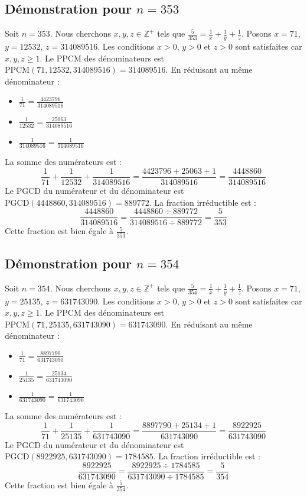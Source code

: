 \documentclass[11pt,a4paper]{article}
\begin{document}
\subsection{Démonstration pour $n = 353$}
Soit $n = 353$. Nous cherchons $x, y, z \in \mathbb{Z}^{+}$ tels que $\frac{5}{353} = \frac{1}{x} + \frac{1}{y} + \frac{1}{z}$.
Posons $x = 71$, $y = 12532$, $z = 314089516$.
Les conditions $x > 0$, $y > 0$ et $z > 0$ sont satisfaites car $x, y, z \geq 1$.
Le PPCM des dénominateurs est $\text{PPCM}(71, 12532, 314089516) = 314089516$.
En réduisant au même dénominateur :
\begin{itemize}
    \item $\frac{1}{71} = \frac{4423796}{314089516}$
    \item $\frac{1}{12532} = \frac{25063}{314089516}$
    \item $\frac{1}{314089516} = \frac{1}{314089516}$
\end{itemize}
La somme des numérateurs est :
$$ \frac{1}{71} + \frac{1}{12532} + \frac{1}{314089516} = \frac{4423796 + 25063 + 1}{314089516} = \frac{4448860}{314089516} $$
Le PGCD du numérateur et du dénominateur est $\text{PGCD}(4448860, 314089516) = 889772$.
La fraction irréductible est :
$$ \frac{4448860}{314089516} = \frac{4448860 \div 889772}{314089516 \div 889772} = \frac{5}{353} $$
Cette fraction est bien égale à $\frac{5}{353}$.

\subsection{Démonstration pour $n = 354$}
Soit $n = 354$. Nous cherchons $x, y, z \in \mathbb{Z}^{+}$ tels que $\frac{5}{354} = \frac{1}{x} + \frac{1}{y} + \frac{1}{z}$.
Posons $x = 71$, $y = 25135$, $z = 631743090$.
Les conditions $x > 0$, $y > 0$ et $z > 0$ sont satisfaites car $x, y, z \geq 1$.
Le PPCM des dénominateurs est $\text{PPCM}(71, 25135, 631743090) = 631743090$.
En réduisant au même dénominateur :
\begin{itemize}
    \item $\frac{1}{71} = \frac{8897790}{631743090}$
    \item $\frac{1}{25135} = \frac{25134}{631743090}$
    \item $\frac{1}{631743090} = \frac{1}{631743090}$
\end{itemize}
La somme des numérateurs est :
$$ \frac{1}{71} + \frac{1}{25135} + \frac{1}{631743090} = \frac{8897790 + 25134 + 1}{631743090} = \frac{8922925}{631743090} $$
Le PGCD du numérateur et du dénominateur est $\text{PGCD}(8922925, 631743090) = 1784585$.
La fraction irréductible est :
$$ \frac{8922925}{631743090} = \frac{8922925 \div 1784585}{631743090 \div 1784585} = \frac{5}{354} $$
Cette fraction est bien égale à $\frac{5}{354}$.
\end{document}
